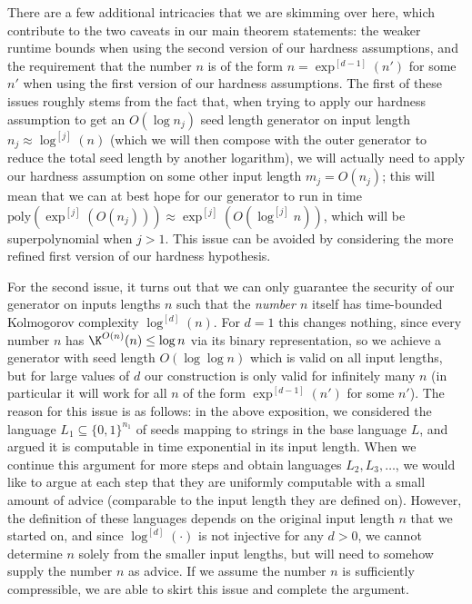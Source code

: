 \documentclass[11pt]{article}
\newcommand{\B}{\{0,1\}}
\renewcommand{\poly}{\mathrm{poly}}
\begin{document}
There are a few additional intricacies that we are skimming over here, which contribute to the two caveats in our main theorem statements: the weaker runtime bounds when using the second version of our hardness assumptions, and the requirement that the number $n$ is of the form $n = \exp^{[d-1]}(n')$ for some $n'$ when using the first version of our hardness assumptions. The first of these issues roughly stems from the fact that, when trying to apply our hardness assumption to get an $O(\log n_j)$ seed length generator on input length $n_j \approx \log^{[j]}(n)$ (which we will then compose with the outer generator to reduce the total seed length by another logarithm), we will actually need to apply our hardness assumption on some other input length $m_j = O(n_j)$; this will mean that we can at best hope for our generator to run in time $\poly(\exp^{[j]}(O(n_j))) \approx \exp^{[j]}(O(\log^{[j]}n))$, which will be superpolynomial when $j>1$. This issue can be avoided by considering the more refined first version of our hardness hypothesis.

For the second issue, it turns out that we can only guarantee the security of our generator on inputs lengths $n$ such that the \emph{number $n$} itself has time-bounded Kolmogorov complexity $\log^{[d]}(n)$. For $d = 1$ this changes nothing, since every number $n$ has $\K^{O(n)}(n) \leq \log n$ via its binary representation, so we achieve a generator with seed length $O(\log \log n)$ which is valid on all input lengths, but for large values of $d$ our construction is only valid for infinitely many $n$ (in particular it will work for all $n$ of the form $\exp^{[d-1]}(n')$ for some $n'$). The reason for this issue is as follows: in the above exposition, we considered the language $L_1 \subseteq \B^{n_1}$ of seeds mapping to strings in the base language $L$, and argued it is computable in time exponential in its input length. When we continue this argument for more steps and obtain languages $L_2,L_3,\ldots$, we would like to argue at each step that they are uniformly computable with a small amount of advice (comparable to the input length they are defined on). However, the definition of these languages depends on the original input length $n$ that we started on, and since $\log^{[d]}(\cdot)$ is not injective for any $d > 0$, we cannot determine $n$ solely from the smaller input lengths, but will need to somehow supply the number $n$ as advice. If we assume the number $n$ is sufficiently compressible, we are able to skirt this issue and complete the argument. 
\end{document}
